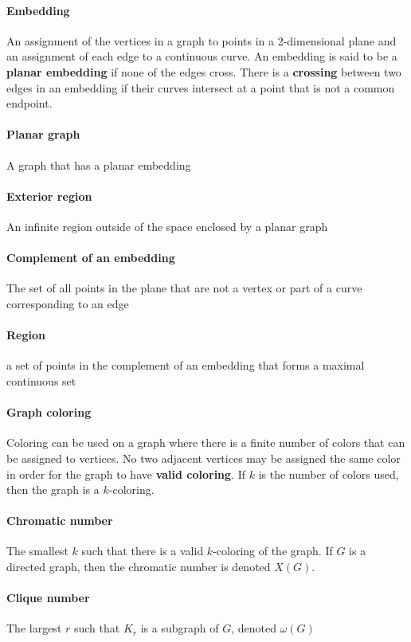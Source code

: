 \documentclass[a4paper]{article}
\begin{document}
  \paragraph{Embedding} An assignment of the vertices in a graph to points in a 2-dimensional plane and an assignment of each edge to a continuous curve. An embedding is said to be a \textbf{planar embedding} if none of the edges cross. There is a \textbf{crossing} between two edges in an embedding if their curves intersect at a point that is not a common endpoint.
  \paragraph{Planar graph} A graph that has a planar embedding
  \paragraph{Exterior region} An infinite region outside of the space enclosed by a planar graph
  \paragraph{Complement of an embedding} The set of all points in the plane that are not a vertex or part of a curve corresponding to an edge
  \paragraph{Region} a set of points in the complement of an embedding that forms a maximal continuous set
  \paragraph{Graph coloring} Coloring can be used on a graph where there is a finite number of colors that can be assigned to vertices. No two adjacent vertices may be assigned the same color in order for the graph to have \textbf{valid coloring}. If $k$ is the number of colors used, then the graph is a $k$-coloring.
  \paragraph{Chromatic number} The smallest $k$ such that there is a valid $k$-coloring of the graph. If $G$ is a directed graph, then the chromatic number is denoted $X(G)$.
  \paragraph{Clique number} The largest $r$ such that $K_r$ is a subgraph of $G$, denoted $\omega(G)$
\end{document}
